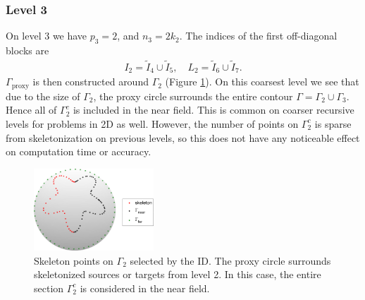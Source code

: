 \documentclass{sfuthesis}
\begin{document}

\subsubsection{Level 3}
On level 3 we have $p_3=2$, and $n_3=2k_2$. 
The indices of the first off-diagonal blocks are
\begin{align*}
	I_2=\tilde{I}_4 \cup \tilde{I}_5, \quad L_2=\tilde{I}_6 \cup \tilde{I}_7.
\end{align*}
$\Gamma_{\text{proxy}}$ is then constructed around $\Gamma_2$ (Figure \ref{fig: ProxyRecLev3Block2}). On this coarsest level we see that due to the size of $\Gamma_2$, the proxy circle surrounds the entire contour $\Gamma=\Gamma_2 \cup \Gamma_3$. Hence all of $\Gamma_2^c$ is included in the near field. This is common on coarser recursive levels for problems in 2D as well. However, the number of points on  $\Gamma_2^c$ is sparse from skeletonization on previous levels, so this does not have any noticeable effect on computation time or accuracy. 
\begin{figure}[h]
 	\centering
  	\includegraphics[width=0.4\textwidth]{ProxyRecLev3Block2}
 	\caption{Skeleton points on $\Gamma_2$ selected by the ID. The proxy circle surrounds skeletonized sources or targets from level 2. In this case, the entire section $\Gamma_2^c$ is considered in the near field. }
 	\label{fig: ProxyRecLev3Block2}
\end{figure}
\end{document}
